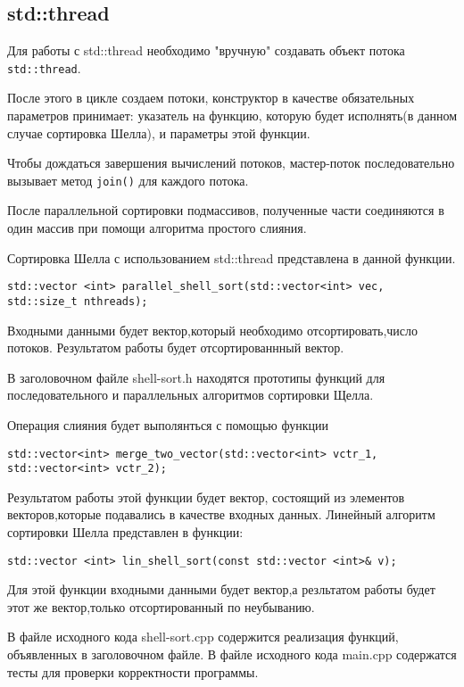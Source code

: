 \documentclass{report}
\begin{document}
\subsection*{std::thread}
Для работы с std::thread необходимо "вручную" создавать объект потока \verb|std::thread|. 
\par После этого в цикле создаем потоки, конструктор в качестве обязательных параметров принимает: указатель на функцию, которую будет исполнять(в данном случае сортировка Шелла), и параметры этой функции.
\par Чтобы дождаться завершения вычислений потоков, мастер-поток последовательно вызывает метод \verb|join()| для каждого потока. 
\par После параллельной сортировки подмассивов, полученные части соединяются в один массив при помощи алгоритма простого слияния.
\par Сортировка Шелла с использованием std::thread представлена в данной функции.
\begin{lstlisting}
std::vector <int> parallel_shell_sort(std::vector<int> vec, std::size_t nthreads);
\end{lstlisting}
Входными данными будет вектор,который необходимо отсортировать,число потоков. Результатом работы будет отсортированнный вектор.

В заголовочном файле shell-sort.h находятся прототипы функций для последовательного и параллельных алгоритмов сортировки Щелла.

Операция слияния будет выполянться с помощью функции 
\begin{lstlisting}
std::vector<int> merge_two_vector(std::vector<int> vctr_1, std::vector<int> vctr_2);
\end{lstlisting}
Результатом работы этой функции будет вектор, состоящий из элементов векторов,которые подавались в качестве входных данных.
Линейный алгоритм сортировки Шелла представлен в функции:
\begin{lstlisting}
std::vector <int> lin_shell_sort(const std::vector <int>& v);
\end{lstlisting}
Для этой функции входными данными будет вектор,а резльтатом работы будет этот же вектор,только отсортированный по неубыванию.

\par В файле исходного кода shell-sort.cpp содержится реализация функций, объявленных в заголовочном файле. В файле исходного кода main.cpp содержатся тесты для проверки корректности программы.
\end{document}
